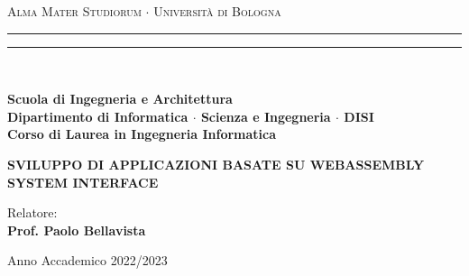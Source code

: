 \documentclass[12pt,a4paper]{report}
\begin{document}
\begin{titlepage}

\begin{center}
{{\Large{\textsc{Alma Mater Studiorum $\cdot$ Università di Bologna}}}} 
\rule[0.1cm]{15.8cm}{0.1mm}
\rule[0.5cm]{15.8cm}{0.6mm}
\\\vspace{3mm}

{\small{\bf Scuola di Ingegneria e Architettura \\ 
Dipartimento di Informatica $\cdot$ Scienza e Ingegneria $\cdot$ DISI\\
Corso di Laurea in Ingegneria Informatica}}


\end{center}

\vspace{23mm}

\begin{center}{
\large \bf SVILUPPO DI APPLICAZIONI BASATE SU WEBASSEMBLY SYSTEM INTERFACE\par
}\end{center}

\vspace{40mm} \par \noindent

\begin{minipage}[t]{0.47\textwidth}{
    \large{
        Relatore:
        \vspace{2mm}\\{
            \bf Prof. Paolo Bellavista
        }
    }
}
\end{minipage}
%
\hfill
%
\begin{minipage}[t]{0.47\textwidth}
\end{minipage}

\vspace{40mm}

\begin{center}
Anno Accademico 2022/2023
\end{center}

\end{titlepage}
\end{document}
